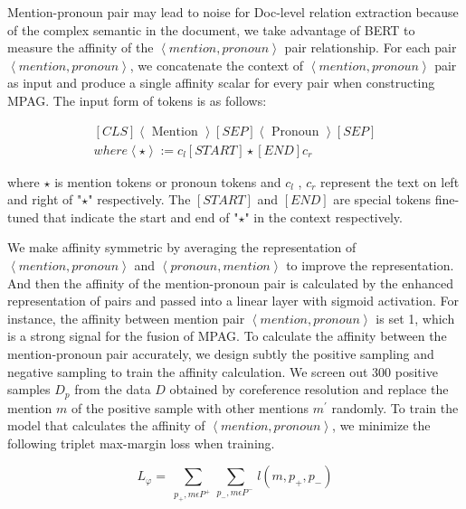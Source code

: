 \documentclass{article}
\begin{document}
Mention-pronoun pair may lead to noise for Doc-level relation extraction because of the complex semantic in the document, we take advantage of BERT to measure the affinity of the $ \left<mention,pronoun \right>$ pair relationship. For each pair $ \left<mention, pronoun \right>$, we concatenate the context of $ \left<mention, pronoun \right>$ pair as input and produce a single affinity scalar for every pair when constructing MPAG. The input form of tokens is as follows:

\begin{equation}
\begin{gathered}
{[CLS] \left<\text { Mention }\right>[SEP]\left<\text { Pronoun }\right>[SEP]} \\
where \left<\star\right>:=c_{l}[S T A R T] \star[E N D] c_{r}
\end{gathered}
\label{eql3}
\end{equation}

where $\star$ is mention tokens or pronoun tokens and $c_{l}$ , $c_{r}$ represent the text on left and right of "$\star$" respectively. The $\left\lbrack {START} \right\rbrack$ and $\left\lbrack {END} \right\rbrack$ are special tokens fine-tuned that indicate the start and end of "$\star$" in the context respectively. 

We make affinity symmetric by averaging the representation of $\left< mention, pronoun \right>$ and $\left< pronoun,mention \right>$ to improve the representation. And then the affinity of the mention-pronoun pair is calculated by the enhanced representation of pairs and passed into a linear layer with sigmoid activation. For instance, the affinity between mention pair $\left< mention, pronoun \right>$ is set 1, which is a strong signal for the fusion of MPAG. To calculate the affinity between the mention-pronoun pair accurately, we design subtly the positive sampling and negative sampling to train the affinity calculation. We screen out 300 positive samples $D_{p}$ from the data $D$ obtained by coreference resolution and replace the mention $m$ of the positive sample with other mentions $m^{\prime}$ randomly. To train the model that calculates the affinity of $\left<mention, pronoun \right>$, we minimize the following triplet max-margin loss when training.

\begin{equation}
L_\varphi=\ \sum_{p_+,m\epsilon P^+\ }\sum_{p_-,m\epsilon P^-\ } l\left(m,p_+,p_-\right)
\label{eql4}
\end{equation}
\end{document}
